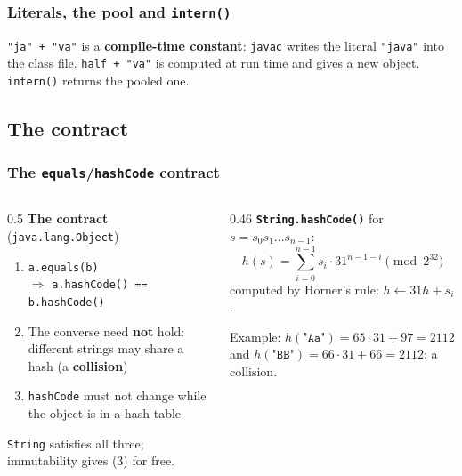 \documentclass[aspectratio=169,10pt,compress]{beamer}
\begin{document}
\begin{frame}[t,fragile] \frametitle{Literals, the pool and \texttt{intern()}}

  \vspace{0.3em}
  \small \texttt{"ja" + "va"} is a \textbf{compile-time constant}: \texttt{javac} writes the literal \texttt{"java"} into the class file.
  \texttt{half + "va"} is computed at run time and gives a new object. \texttt{intern()} returns the pooled one.
\end{frame}


\subsection[Contract]{The contract}




\begin{frame}[t,fragile] \frametitle{The \texttt{equals}/\texttt{hashCode} contract}
  \begin{columns}[T]
    \begin{column}{0.5\textwidth}
      \textbf{The contract} (\texttt{java.lang.Object})
      \begin{enumerate}\small
        \item \texttt{a.equals(b)}\\ 
        		$\Rightarrow$ \texttt{a.hashCode() == b.hashCode()}
        \item The converse need \textbf{not} hold: different strings may share a hash (a \textbf{collision})
        \item \texttt{hashCode} must not change while the object is in a hash table
      \end{enumerate}
      \small \texttt{String} satisfies all three; immutability gives (3) for free.
    \end{column}
    \begin{column}{0.46\textwidth}
      \textbf{\texttt{String.hashCode()}} for $s = s_{0} s_{1} \dots s_{n-1}$:
      \[
      	h(s) = \sum_{i=0}^{n-1} s_{i} \cdot 31^{n-1-i} \pmod{2^{32}}
      \]
      \small computed by Horner's rule: $h \leftarrow 31 h + s_{i}$.
      \vspace{0.4em}

      Example: $h(\texttt{"Aa"}) = 65 \cdot 31 + 97 = 2112$ and
      $h(\texttt{"BB"}) = 66 \cdot 31 + 66 = 2112$: a collision.
    \end{column}
  \end{columns}
\end{frame}
\end{document}

